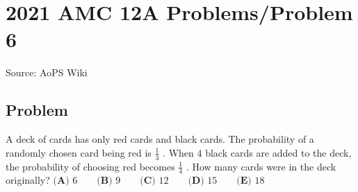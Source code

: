 \documentclass[12pt]{article}
\begin{document}
\section*{{2021 AMC 12A Problems/Problem 6}}
Source: AoPS Wiki

\subsection*{Problem}
A deck of cards has only red cards and black cards. The probability of a randomly chosen card being red is $\frac13$ . When $4$ black cards are added to the deck, the probability of choosing red becomes $\frac14$ . How many cards were in the deck originally? $\textbf{(A) }6 \qquad \textbf{(B) }9 \qquad \textbf{(C) }12 \qquad \textbf{(D) }15 \qquad \textbf{(E) }18$
\end{document}
